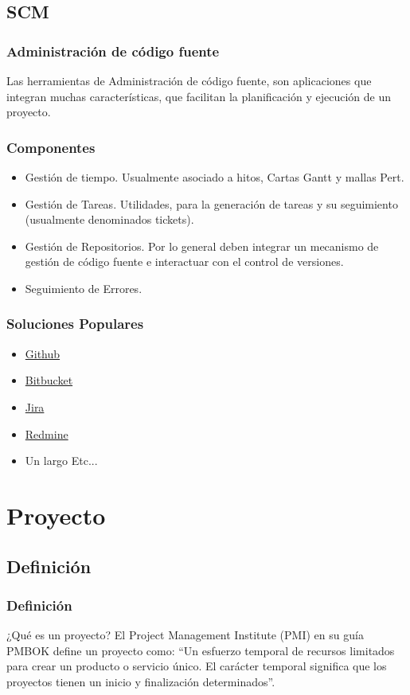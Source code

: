 \documentclass[12pt]{beamer}
\begin{document}
\subsection{SCM}

\begin{frame}
 \frametitle{Administración de código fuente}
 Las herramientas de Administración de código fuente, son aplicaciones que integran muchas características, que facilitan la planificación y ejecución de un proyecto.
\end{frame}


\begin{frame}
 \frametitle{Componentes}
 \begin{itemize}
  \item<2-> Gestión de tiempo. Usualmente asociado a hitos, Cartas Gantt y mallas Pert. 
  \item<3-> Gestión de Tareas. Utilidades, para la generación de tareas y su seguimiento (usualmente denominados tickets).
  \item<4-> Gestión de Repositorios. Por lo general deben integrar un mecanismo de gestión de código fuente e interactuar con el control de versiones.
  \item<5-> Seguimiento de Errores.
 \end{itemize}
\end{frame}


\begin{frame}
 \frametitle{Soluciones Populares}
 \begin{itemize}
  \item<2-> \href{https://github.com/}{Github} 
  \item<3-> \href{https://bitbucket.org/}{Bitbucket}
  \item<4-> \href{http://www.atlassian.com/software/jira/overview}{Jira}
  \item<5-> \href{http://www.redmine.org/}{Redmine}
  \item<6-> Un largo Etc...
 \end{itemize}
\end{frame}



\section{Proyecto}
\subsection{Definición}
\begin{frame}
\frametitle{Definición}
\begin{block}{¿Qué es un proyecto?}
El Project Management Institute (PMI) en su guía PMBOK define un proyecto como:
\pause 
\alert{``Un esfuerzo temporal de recursos limitados para crear un producto o servicio único. El  carácter temporal significa que los proyectos tienen un inicio y finalización determinados''.}
\end{block}
\end{frame}
\end{document}
